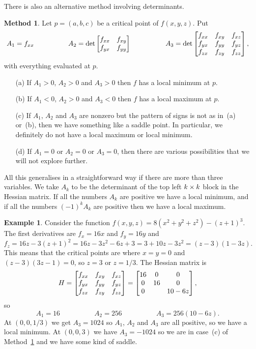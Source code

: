 \documentclass[reqno]{amsart}
\theoremstyle{definition}
\newtheorem{example}[theorem]{Example}
\newtheorem{method}[theorem]{Method}
\begin{document}
There is also an alternative method involving determinants.
\begin{method}\label{meth-hessian-entries-three}
 Let $p=(a,b,c)$ be a critical point of $f(x,y,z)$.  Put 
 \[ A_1 = f_{xx}
     \hspace{5em}
    A_2 = \det\left[\begin{matrix} f_{xx} & f_{xy} \\ f_{yx} & f_{yy} \end{matrix}\right]
     \hspace{5em}
    A_3 = \det\left[\begin{matrix} f_{xx} & f_{xy} & f_{xz} \\
                   f_{yx} & f_{yy} & f_{yz} \\
                   f_{zx} & f_{zy} & f_{zz} \end{matrix}\right], 
 \]
 with everything evaluated at $p$.
 \begin{itemize}
  \item[(a)] If $A_1>0$, $A_2>0$ and $A_3>0$ then $f$ has a local
   minimum at $p$.
  \item[(b)] If $A_1<0$, $A_2>0$ and $A_3<0$ then $f$ has a local
   maximum at $p$. 
  \item[(c)] If $A_1$, $A_2$ and $A_3$ are nonzero but the pattern of
   signs is not as in~(a) or~(b), then we have something like a saddle
   point.  In particular, we definitely do not have a local maximum or
   local minimum.
  \item[(d)] If $A_1=0$ or $A_2=0$ or $A_3=0$, then there are
   various possibilities that we will not explore further.
 \end{itemize}
 All this generalises in a straightforward way if there are more than
 three variables.  We take $A_k$ to be the determinant of the top left
 $k\times k$ block in the Hessian matrix.  If all the numbers $A_k$ are
 positive we have a local minimum, and if all the numbers $(-1)^kA_k$
 are positive then we have a local maximum.
\end{method}

\begin{example}
 Consider the function $f(x,y,z)=8(x^2+y^2+z^2)-(z+1)^3$.  The first
 derivatives are $f_x=16x$ and $f_y=16y$ and 
 \[ f_z = 16z - 3(z+1)^2 = 
     16z - 3z^2 - 6z + 3 = 
      3+10z-3z^2 = (z-3)(1-3z).
 \]
 This means that the critical points are where $x=y=0$ and
 $(z-3)(3z-1)=0$, so $z=3$ or $z=1/3$.  The Hessian matrix is 
 \[ H = \left[\begin{matrix} f_{xx} & f_{xy} & f_{xz} \\
             f_{yx} & f_{yy} & f_{yz} \\
             f_{zx} & f_{zy} & f_{zz} \end{matrix}\right] =
        \left[\begin{matrix} 16 & 0  & 0 \\
             0  & 16 & 0 \\
             0  &    & 10-6z \end{matrix}\right],
 \]
 so 
 \[ A_1 = 16 \hspace{5em} A_2 = 256 \hspace{5em} A_3 = 256(10-6z). \]
 At $(0,0,1/3)$ we get $A_3=1024$ so $A_1$, $A_2$ and $A_3$ are all
 positive, so we have a local minimum.  At $(0,0,3)$ we have
 $A_3=-1024$ so we are in case~(c) of
 Method~\ref{meth-hessian-entries-three} and we have some kind of
 saddle. 
\end{example}
\end{document}
